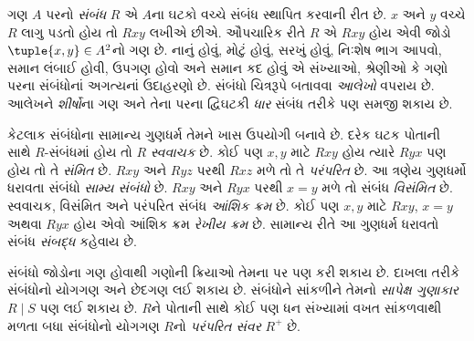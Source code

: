 ગણ $A$ પરનો \emph{સંબંધ} $R$ એ $A$ના ઘટકો વચ્ચે સંબંધ સ્થાપિત કરવાની રીત છે. $x$ અને $y$ વચ્ચે $R$ લાગુ પડતો હોય તો $Rxy$ લખીએ છીએ. ઔપચારિક રીતે $R$ એ $Rxy$ હોય એવી જોડો $\tuple{x,y}\in A^2$નો ગણ છે. નાનું હોવું, મોટું હોવું, સરખું હોવું, નિઃશેષ ભાગ આપવો, સમાન લંબાઈ હોવી, ઉપગણ હોવો અને સમાન કદ હોવું એ સંખ્યાઓ, શ્રેણીઓ કે ગણો પરના સંબંધોનાં અગત્યનાં ઉદાહરણો છે. સંબંધો ચિત્રરૂપે બતાવવા \emph{આલેખો} વપરાય છે. આલેખને \emph{શીર્ષો}ના ગણ અને તેના પરના દ્વિઘટકી \emph{ધાર} સંબંધ તરીકે પણ સમજી શકાય છે.

કેટલાક સંબંધોના સામાન્ય ગુણધર્મ તેમને ખાસ ઉપયોગી બનાવે છે. દરેક ઘટક પોતાની સાથે $R$-સંબંધમાં હોય તો $R$ \emph{સ્વવાચક} છે. કોઈ પણ $x,y$ માટે $Rxy$ હોય ત્યારે $Ryx$ પણ હોય તો તે \emph{સંમિત} છે. $Rxy$ અને $Ryz$ પરથી $Rxz$ મળે તો તે \emph{પરંપરિત} છે. આ ત્રણેય ગુણધર્મો ધરાવતા સંબંધો \emph{સામ્ય સંબંધો} છે. $Rxy$ અને $Ryx$ પરથી $x=y$ મળે તો સંબંધ \emph{વિસંમિત} છે. સ્વવાચક, વિસંમિત અને પરંપરિત સંબંધ \emph{આંશિક ક્રમ} છે. કોઈ પણ $x,y$ માટે $Rxy$, $x=y$ અથવા $Ryx$ હોય એવો આંશિક ક્રમ \emph{રેખીય ક્રમ} છે. સામાન્ય રીતે આ ગુણધર્મ ધરાવતો સંબંધ \emph{સંબદ્ધ} કહેવાય છે.

સંબંધો જોડોના ગણ હોવાથી ગણોની ક્રિયાઓ તેમના પર પણ કરી શકાય છે. દાખલા તરીકે સંબંધોનો યોગગણ અને છેદગણ લઈ શકાય છે. સંબંધોને સાંકળીને તેમનો \emph{સાપેક્ષ ગુણાકાર} $R\mid S$ પણ લઈ શકાય છે. $R$ને પોતાની સાથે કોઈ પણ ધન સંખ્યામાં વખત સાંકળવાથી મળતા બધા સંબંધોનો યોગગણ $R$નો \emph{પરંપરિત સંવર} $R^+$ છે.
